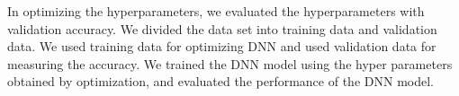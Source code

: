 \documentclass[useamsfonts]{pasj01}
\begin{document}
In optimizing the hyperparameters, we evaluated the hyperparameters with validation accuracy.
We divided the data set into training data and validation data.
We used training data for optimizing DNN and used validation data for measuring the accuracy.
We trained the DNN model using the hyper parameters obtained by optimization, and evaluated the performance of the DNN model.
\end{document}
